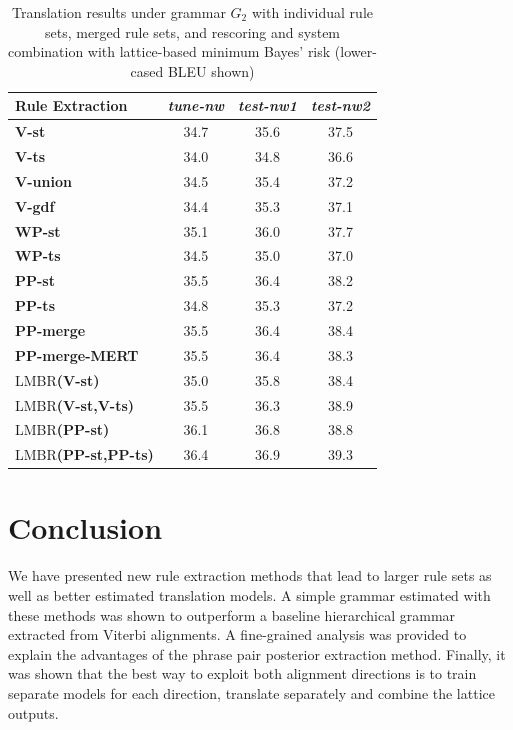 \begin{table}[thbp]
\begin{center}
\begin{tabular}{|l|c|c|c|}
\hline
Rule Extraction & {\em \footnotesize tune-nw} & {\em \footnotesize test-nw1} & {\em \footnotesize test-nw2} \\ \cline{2-4}
\hline
{\bf V-st}    & 34.7  & 35.6  & 37.5 \\
{\bf V-ts}    & 34.0 & 34.8 & 36.6 \\
{\bf V-union}  & 34.5 & 35.4 & 37.2 \\
{\bf V-gdf}    & 34.4 & 35.3 & 37.1 \\
{\bf WP-st}    & 35.1 & 36.0 & 37.7 \\
{\bf WP-ts}    & 34.5 & 35.0 & 37.0 \\
{\bf PP-st}    & 35.5 & 36.4 & 38.2 \\
{\bf PP-ts}    & 34.8 & 35.3 & 37.2 \\
\hline
{\bf PP-merge}    & 35.5 & 36.4 &  38.4 \\
{\bf PP-merge-MERT}  & 35.5 & 36.4 &  38.3 \\
\hline
LMBR{\bf(V-st)}        & 35.0 & 35.8 & 38.4 \\
LMBR{\bf(V-st,V-ts)}   & 35.5 & 36.3 & 38.9 \\
LMBR{\bf(PP-st)}       & 36.1 & 36.8 & 38.8 \\
LMBR{\bf(PP-st,PP-ts)} & 36.4 & 36.9 & 39.3 \\
\hline
\end{tabular}
\end{center}
\caption{Translation results under grammar $G_2$ with individual rule sets, merged rule sets, and rescoring and system combination with lattice-based minimum Bayes' risk (lower-cased BLEU shown)}
\label{tab:symm}
\end{table}

\section{Conclusion}
\label{sec:extractionFromPosteriorsConclusion}

We have presented new rule extraction methods that lead to larger rule sets as
well as better estimated translation models. A simple grammar estimated with
these methods was shown to outperform a baseline hierarchical grammar extracted
from Viterbi alignments. A fine-grained analysis was provided to explain the
advantages of the phrase pair posterior extraction method. Finally, it was shown
that the best way to exploit both alignment directions is to train separate
models for each direction, translate separately and combine the lattice outputs.
